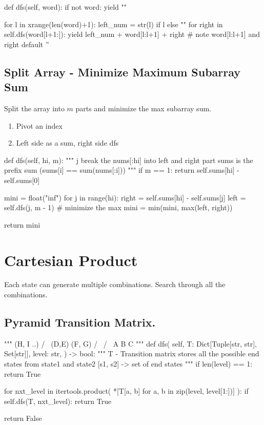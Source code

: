 \begin{python}
def dfs(self, word):
    if not word:
        yield ""

    for l in xrange(len(word)+1):
        left_num = str(l) if l else ""
        for right in self.dfs(word[l+1:]):
            yield left_num + word[l:l+1] + right
            # note word[l:l+1] and right default ''
\end{python}

\subsection{Split Array - Minimize Maximum Subarray Sum}
Split the array into $m$ parts and minimize the max subarray sum.
\begin{enumerate}
\item Pivot an index
\item Left side as a sum, right side dfs 
\end{enumerate}

\begin{python}
def dfs(self, hi, m):
    """
    j break the nums[:hi] into left and right part
    sums is the prefix sum (sums[i] == sum(nums[:i]))
    """
    if m == 1:
        return self.sums[hi] - self.sums[0]

    mini = float("inf")
    for j in range(hi):
        right = self.sums[hi] - self.sums[j]
        left = self.dfs(j, m - 1)
        # minimize the max
        mini = min(mini, max(left, right))

    return mini
\end{python}


\section{Cartesian Product}
Each state can generate multiple combinations. Search through all the combinations.
\subsection{Pyramid Transition Matrix.}
\begin{python}
"""
 (H, I ..)
   / \
(D,E) (F, G)
 / \ / \
A   B   C
"""
def dfs(
    self, 
    T: Dict[Tuple[str, str], Set[str]], 
    level: str,
) -> bool:
    """
    T - Transition matrix
    stores all the possible end states from state1 and state2
    [s1, s2] -> set of end states 
    """
    if len(level) == 1:
        return True

    for nxt_level in itertools.product(
        *[T[a, b] for a, b in zip(level, level[1:])]
    ):
        if self.dfs(T, nxt_level):
            return True

    return False

\end{python}


